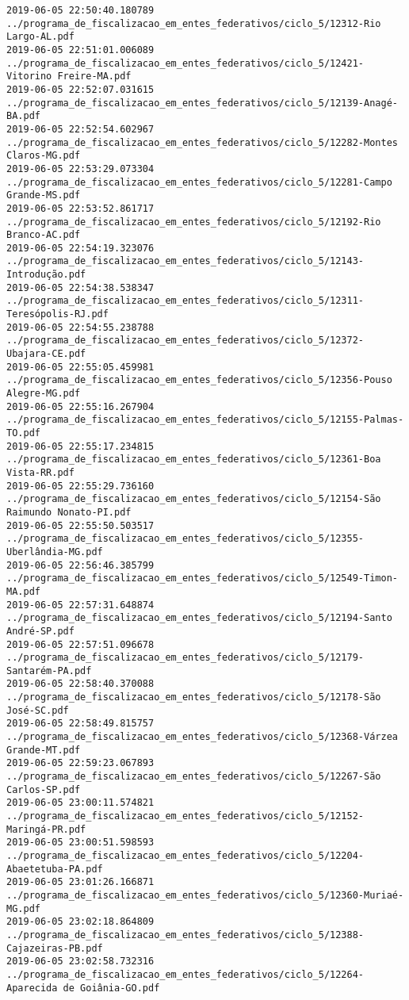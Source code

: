 \begin{lstlisting}
2019-06-05 22:50:40.180789 ../programa_de_fiscalizacao_em_entes_federativos/ciclo_5/12312-Rio Largo-AL.pdf
2019-06-05 22:51:01.006089 ../programa_de_fiscalizacao_em_entes_federativos/ciclo_5/12421-Vitorino Freire-MA.pdf
2019-06-05 22:52:07.031615 ../programa_de_fiscalizacao_em_entes_federativos/ciclo_5/12139-Anagé-BA.pdf
2019-06-05 22:52:54.602967 ../programa_de_fiscalizacao_em_entes_federativos/ciclo_5/12282-Montes Claros-MG.pdf
2019-06-05 22:53:29.073304 ../programa_de_fiscalizacao_em_entes_federativos/ciclo_5/12281-Campo Grande-MS.pdf
2019-06-05 22:53:52.861717 ../programa_de_fiscalizacao_em_entes_federativos/ciclo_5/12192-Rio Branco-AC.pdf
2019-06-05 22:54:19.323076 ../programa_de_fiscalizacao_em_entes_federativos/ciclo_5/12143-Introdução.pdf
2019-06-05 22:54:38.538347 ../programa_de_fiscalizacao_em_entes_federativos/ciclo_5/12311-Teresópolis-RJ.pdf
2019-06-05 22:54:55.238788 ../programa_de_fiscalizacao_em_entes_federativos/ciclo_5/12372-Ubajara-CE.pdf
2019-06-05 22:55:05.459981 ../programa_de_fiscalizacao_em_entes_federativos/ciclo_5/12356-Pouso Alegre-MG.pdf
2019-06-05 22:55:16.267904 ../programa_de_fiscalizacao_em_entes_federativos/ciclo_5/12155-Palmas-TO.pdf
2019-06-05 22:55:17.234815 ../programa_de_fiscalizacao_em_entes_federativos/ciclo_5/12361-Boa Vista-RR.pdf
2019-06-05 22:55:29.736160 ../programa_de_fiscalizacao_em_entes_federativos/ciclo_5/12154-São Raimundo Nonato-PI.pdf
2019-06-05 22:55:50.503517 ../programa_de_fiscalizacao_em_entes_federativos/ciclo_5/12355-Uberlândia-MG.pdf
2019-06-05 22:56:46.385799 ../programa_de_fiscalizacao_em_entes_federativos/ciclo_5/12549-Timon-MA.pdf
2019-06-05 22:57:31.648874 ../programa_de_fiscalizacao_em_entes_federativos/ciclo_5/12194-Santo André-SP.pdf
2019-06-05 22:57:51.096678 ../programa_de_fiscalizacao_em_entes_federativos/ciclo_5/12179-Santarém-PA.pdf
2019-06-05 22:58:40.370088 ../programa_de_fiscalizacao_em_entes_federativos/ciclo_5/12178-São José-SC.pdf
2019-06-05 22:58:49.815757 ../programa_de_fiscalizacao_em_entes_federativos/ciclo_5/12368-Várzea Grande-MT.pdf
2019-06-05 22:59:23.067893 ../programa_de_fiscalizacao_em_entes_federativos/ciclo_5/12267-São Carlos-SP.pdf
2019-06-05 23:00:11.574821 ../programa_de_fiscalizacao_em_entes_federativos/ciclo_5/12152-Maringá-PR.pdf
2019-06-05 23:00:51.598593 ../programa_de_fiscalizacao_em_entes_federativos/ciclo_5/12204-Abaetetuba-PA.pdf
2019-06-05 23:01:26.166871 ../programa_de_fiscalizacao_em_entes_federativos/ciclo_5/12360-Muriaé-MG.pdf
2019-06-05 23:02:18.864809 ../programa_de_fiscalizacao_em_entes_federativos/ciclo_5/12388-Cajazeiras-PB.pdf
2019-06-05 23:02:58.732316 ../programa_de_fiscalizacao_em_entes_federativos/ciclo_5/12264-Aparecida de Goiânia-GO.pdf

\end{lstlisting}
